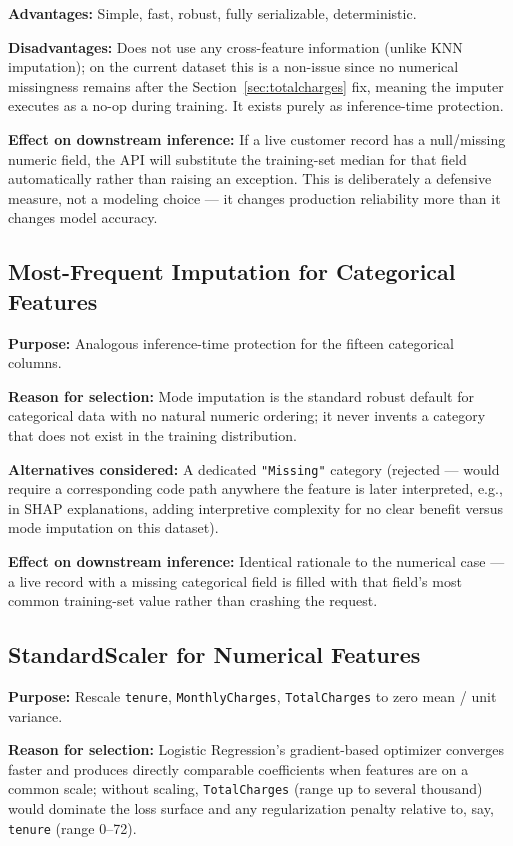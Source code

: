 \documentclass[11pt]{article}
\newcommand{\artifact}[1]{\texttt{\color{navy}#1}}
\begin{document}
\textbf{Advantages:} Simple, fast, robust, fully serializable, deterministic.

\textbf{Disadvantages:} Does not use any cross-feature information (unlike KNN imputation); on the current dataset this is a non-issue since no numerical missingness remains after the Section~\ref{sec:totalcharges} fix, meaning the imputer executes as a no-op during training. It exists purely as inference-time protection.

\textbf{Effect on downstream inference:} If a live customer record has a null/missing numeric field, the API will substitute the training-set median for that field automatically rather than raising an exception. This is deliberately a defensive measure, not a modeling choice --- it changes production reliability more than it changes model accuracy.

\subsection{Most-Frequent Imputation for Categorical Features}

\textbf{Purpose:} Analogous inference-time protection for the fifteen categorical columns.

\textbf{Reason for selection:} Mode imputation is the standard robust default for categorical data with no natural numeric ordering; it never invents a category that does not exist in the training distribution.

\textbf{Alternatives considered:} A dedicated \texttt{"Missing"} category (rejected --- would require a corresponding code path anywhere the feature is later interpreted, e.g., in SHAP explanations, adding interpretive complexity for no clear benefit versus mode imputation on this dataset).

\textbf{Effect on downstream inference:} Identical rationale to the numerical case --- a live record with a missing categorical field is filled with that field's most common training-set value rather than crashing the request.

\subsection{StandardScaler for Numerical Features}
\label{sec:scaling}

\textbf{Purpose:} Rescale \artifact{tenure}, \artifact{MonthlyCharges}, \artifact{TotalCharges} to zero mean / unit variance.

\textbf{Reason for selection:} Logistic Regression's gradient-based optimizer converges faster and produces directly comparable coefficients when features are on a common scale; without scaling, \artifact{TotalCharges} (range up to several thousand) would dominate the loss surface and any regularization penalty relative to, say, \artifact{tenure} (range 0--72).
\end{document}
